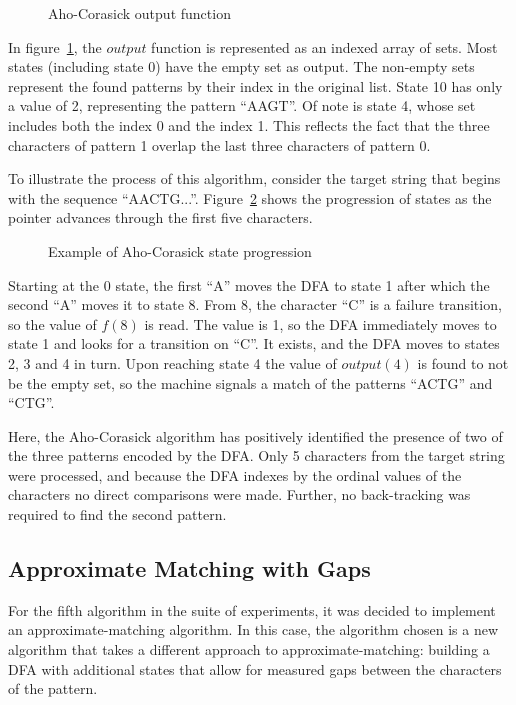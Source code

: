 \begin{figure}[ht]
\centering

\caption{Aho-Corasick output function}
\label{fig:ac_output_function}
\end{figure}

In figure~\ref{fig:ac_output_function}, the $output$ function is represented as an indexed array of sets. Most states (including state 0) have the empty set as output. The non-empty sets represent the found patterns by their index in the original list. State 10 has only a value of 2, representing the pattern ``AAGT''. Of note is state 4, whose set includes both the index 0 and the index 1. This reflects the fact that the three characters of pattern 1 overlap the last three characters of pattern 0.

To illustrate the process of this algorithm, consider the target string that begins with the sequence ``AACTG...''. Figure~\ref{fig:ac_progression} shows the progression of states as the pointer advances through the first five characters.

\begin{figure}[ht]
\centering

\caption{Example of Aho-Corasick state progression}
\label{fig:ac_progression}
\end{figure}

Starting at the 0 state, the first ``A'' moves the DFA to state 1 after which the second ``A'' moves it to state 8. From 8, the character ``C'' is a failure transition, so the value of $f(8)$ is read. The value is 1, so the DFA immediately moves to state 1 and looks for a transition on ``C''. It exists, and the DFA moves to states 2, 3 and 4 in turn. Upon reaching state 4 the value of $output(4)$ is found to not be the empty set, so the machine signals a match of the patterns ``ACTG'' and ``CTG''.

Here, the Aho-Corasick algorithm has positively identified the presence of two of the three patterns encoded by the DFA. Only 5 characters from the target string were processed, and because the DFA indexes by the ordinal values of the characters no direct comparisons were made. Further, no back-tracking was required to find the second pattern.

\subsection{Approximate Matching with Gaps}
\label{subsec:dfa_gap}

For the fifth algorithm in the suite of experiments, it was decided to implement an approximate-matching algorithm. In this case, the algorithm chosen is a new algorithm that takes a different approach to approximate-matching: building a DFA with additional states that allow for measured gaps between the characters of the pattern.

